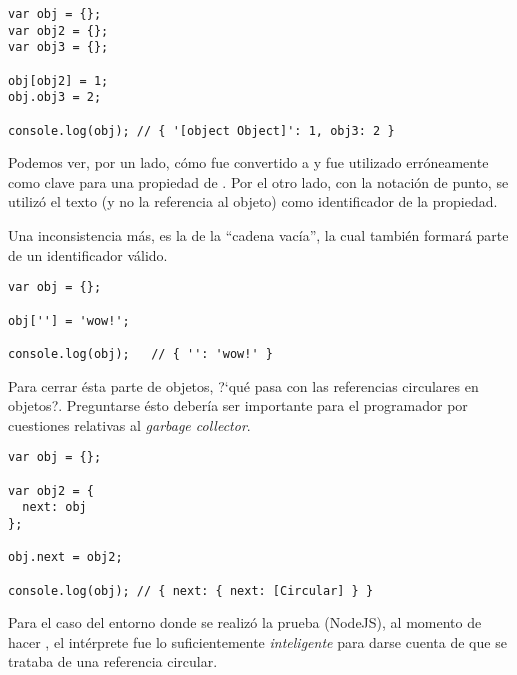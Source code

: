 \begin{lstlisting}[title={Utilizando objetos como claves}]
var obj = {};
var obj2 = {};
var obj3 = {};

obj[obj2] = 1;
obj.obj3 = 2;

console.log(obj); // ​​​​​{ '[object Object]': 1, obj3: 2 }​​​​​
\end{lstlisting}

Podemos ver, por un lado, cómo  fue convertido a  y fue utilizado erróneamente como clave para una propiedad de . Por el otro lado, con la notación de punto, se utilizó el texto  (y no la referencia al objeto) como identificador de la propiedad. 

Una inconsistencia más, es la de la "`cadena vacía"', la cual también formará parte de un identificador válido.

\begin{lstlisting}[title={Cadena vacía como clave}]
var obj = {};

obj[''] = 'wow!';

console.log(obj);	// ​​​​​{ '': 'wow!' }​​​​​ 
\end{lstlisting}

Para cerrar ésta parte de objetos, ?`qué pasa con las referencias circulares en objetos?. Preguntarse ésto debería ser importante para el programador por cuestiones relativas al \textit{garbage collector}.

\begin{lstlisting}[title={Referencias circulares con objetos}]
var obj = {};

var obj2 = {
  next: obj
};

obj.next = obj2;

console.log(obj); // { next: { next: [Circular] } }​​​​​
\end{lstlisting}

Para el caso del entorno donde se realizó la prueba (NodeJS), al momento de hacer , el intérprete fue lo suficientemente \textit{inteligente} para darse cuenta de que se trataba de una referencia circular.